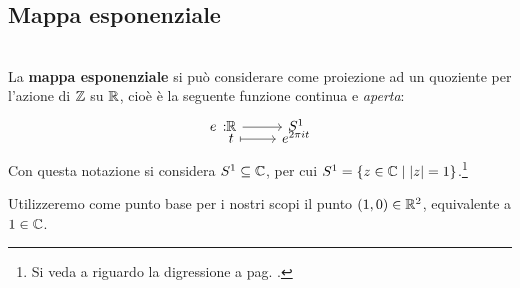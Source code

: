 \subsection{Mappa esponenziale}
\begin{define}~{}\\
La \textbf{mappa esponenziale} si può considerare come proiezione ad un quoziente per l'azione di $\mathbb{Z}$ su $\mathbb{R}$, cioè è la seguente funzione continua e \textit{aperta}:
	\begin{equation*}
		\funztot e \realset {S^1} t {e^{2\pi i t}}
	\end{equation*}
Con questa notazione si considera $S^1\subseteq\mathbb{C}$, per cui $S^1=\{z\in\mathbb{C} \mid |z|=1 \}$.\footnote{Si veda a riguardo la digressione a pag. \pageref{complessir2}.}
\end{define}
Utilizzeremo come punto base per i nostri scopi il punto $(1,0) \in \mathbb{R}^2$, equivalente a $1\in\mathbb{C}$.
